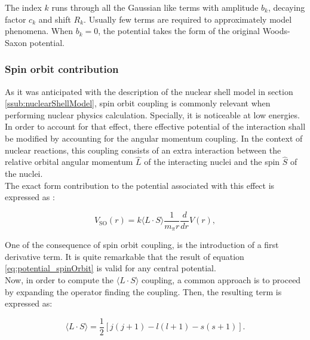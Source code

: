 \documentclass[openany]{book}
\begin{document}
The index $k$ runs through all the Gaussian like terms with amplitude $b_k$, decaying factor $c_k$ and shift $R_k$. Usually few terms are required to approximately model phenomena. When $b_k = 0$, the potential takes the form of the original Woods-Saxon potential.  \\


\subsubsection{Spin orbit contribution} \label{sub:potential_effective_spinOrbit}

As it was anticipated with the description of the nuclear shell model in section \ref{ssub:nuclearShellModel}, spin orbit coupling is commonly relevant when performing nuclear physics calculation. Specially, it is noticeable at low energies. \\

In order to account for that effect, there effective potential of the interaction shall be modified by accounting for the angular momentum coupling. In the context of nuclear reactions, this coupling consists of an extra interaction between the relative orbital angular momentum $\hat L$ of the interacting nuclei and the spin $\hat S$ of the nuclei. \\

The exact form contribution to the potential associated with this effect is expressed as \cite{ghasemi_sadeghi_2018}:

\begin{equation}  \label{eq:potential_spinOrbit}
	V_{\mathrm{SO}}(r) = k\langle L \cdot S \rangle  \frac{1}{m_{\pi}r} \frac{d}{dr} V(r),
\end{equation}

One of the consequence of spin orbit coupling, is the introduction of a first derivative term. It is quite remarkable that the result of equation \ref{eq:potential_spinOrbit} is valid for any central potential.  \\

Now, in order to compute the   $  \langle L \cdot S \rangle$ coupling, a common approach is to proceed by expanding the operator finding the coupling. Then, the resulting term is expressed as: 

\begin{equation}  \label{eq:potential_spinOrbit_LSexpansion}
	\langle L \cdot S \rangle =  \frac{1}{2}[j(j+1) - l(l+1) - s(s+1)].
\end{equation}
\end{document}

